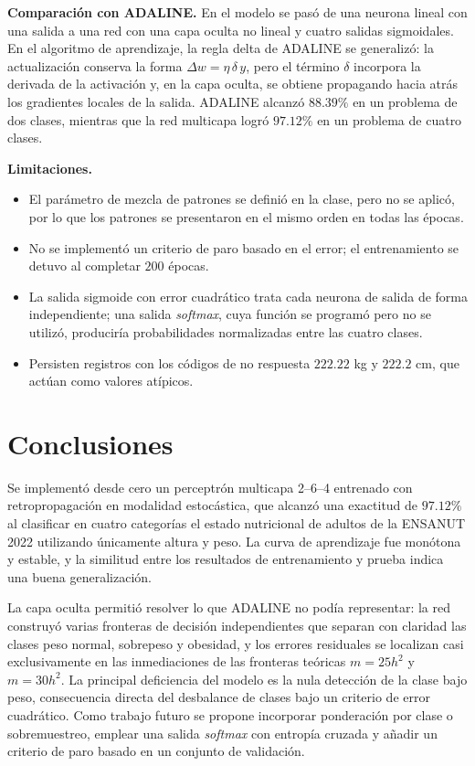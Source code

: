 \documentclass[conference]{IEEEtran}
\begin{document}
\textbf{Comparación con ADALINE.} En el modelo se pasó de una neurona lineal
con una salida a una red con una capa oculta no lineal y cuatro salidas
sigmoidales. En el algoritmo de aprendizaje, la regla delta de ADALINE se
generalizó: la actualización conserva la forma
$\Delta w=\eta\,\delta\,y$, pero el término $\delta$ incorpora la derivada
de la activación y, en la capa oculta, se obtiene propagando hacia atrás
los gradientes locales de la salida. ADALINE alcanzó $88.39\%$ en un
problema de dos clases, mientras que la red multicapa logró $97.12\%$ en un
problema de cuatro clases.

\textbf{Limitaciones.}
\begin{itemize}
    \item El parámetro de mezcla de patrones se definió en la clase, pero
    no se aplicó, por lo que los patrones se presentaron en el mismo orden
    en todas las épocas.
    \item No se implementó un criterio de paro basado en el error; el
    entrenamiento se detuvo al completar $200$ épocas.
    \item La salida sigmoide con error cuadrático trata cada neurona de
    salida de forma independiente; una salida \textit{softmax}, cuya
    función se programó pero no se utilizó, produciría probabilidades
    normalizadas entre las cuatro clases.
    \item Persisten registros con los códigos de no respuesta $222.22$ kg y
    $222.2$ cm, que actúan como valores atípicos.
\end{itemize}

\section{Conclusiones}
Se implementó desde cero un perceptrón multicapa 2--6--4 entrenado con
retropropagación en modalidad estocástica, que alcanzó una exactitud de
$97.12\%$ al clasificar en cuatro categorías el estado nutricional de
adultos de la ENSANUT 2022 utilizando únicamente altura y peso. La curva de
aprendizaje fue monótona y estable, y la similitud entre los resultados de
entrenamiento y prueba indica una buena generalización.

La capa oculta permitió resolver lo que ADALINE no podía representar: la red
construyó varias fronteras de decisión independientes que separan con
claridad las clases peso normal, sobrepeso y obesidad, y los errores
residuales se localizan casi exclusivamente en las inmediaciones de las
fronteras teóricas $m=25h^2$ y $m=30h^2$. La principal deficiencia del modelo
es la nula detección de la clase bajo peso, consecuencia directa del
desbalance de clases bajo un criterio de error cuadrático. Como trabajo
futuro se propone incorporar ponderación por clase o sobremuestreo, emplear una salida
\textit{softmax} con entropía cruzada y añadir un criterio de paro basado en
un conjunto de validación.
\end{document}
